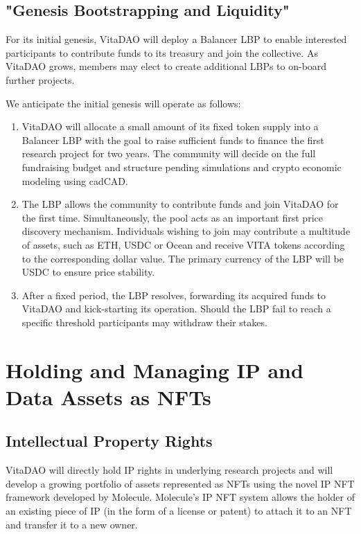 \documentclass[12pt,letterpaper]{article}
\begin{document}
\subsection{"Genesis Bootstrapping and Liquidity"}
For its initial genesis, VitaDAO will deploy a Balancer LBP to enable interested participants to contribute funds to its treasury and join the collective. As VitaDAO grows, members may elect to create additional LBPs to on-board further projects.

We anticipate the initial genesis will operate as follows:
\begin{enumerate}
\item VitaDAO will allocate a small amount of its fixed token supply into a Balancer LBP with the goal to raise sufficient funds to finance the first research project for two years. The community will decide on the full fundraising budget and structure pending simulations and crypto economic modeling using cadCAD.
\item The LBP allows the community to contribute funds and join VitaDAO for the first time. Simultaneously, the pool acts as an important first price discovery mechanism. Individuals wishing to join may contribute a multitude of assets, such as ETH, USDC or Ocean and receive VITA tokens according to the corresponding dollar value. The primary currency of the LBP will be USDC to ensure price stability.
\item After a fixed period, the LBP resolves, forwarding its acquired funds to VitaDAO and kick-starting its operation. Should the LBP fail to reach a specific threshold participants may withdraw their stakes.
\end{enumerate}

\section{Holding and Managing IP and Data Assets as NFTs}

\subsection{Intellectual Property Rights}
VitaDAO will directly hold IP rights in underlying research projects and will develop a growing portfolio of assets represented as NFTs using the  novel IP NFT framework developed by Molecule. Molecule’s IP NFT system allows the holder of an existing piece of IP (in the form of a license or patent) to attach it to an NFT and transfer it to a new owner.
\end{document}
